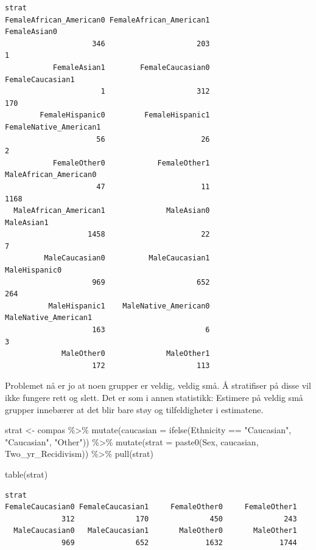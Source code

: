 \documentclass[
  letterpaper,
  DIV=11,
  numbers=noendperiod]{scrreprt}
\newenvironment{Shaded}{\begin{snugshade}}{\end{snugshade}}
\newcommand{\AttributeTok}[1]{\textcolor[rgb]{0.40,0.45,0.13}{#1}}
\newcommand{\FunctionTok}[1]{\textcolor[rgb]{0.28,0.35,0.67}{#1}}
\newcommand{\NormalTok}[1]{\textcolor[rgb]{0.00,0.23,0.31}{#1}}
\newcommand{\OtherTok}[1]{\textcolor[rgb]{0.00,0.23,0.31}{#1}}
\newcommand{\SpecialCharTok}[1]{\textcolor[rgb]{0.37,0.37,0.37}{#1}}
\newcommand{\StringTok}[1]{\textcolor[rgb]{0.13,0.47,0.30}{#1}}
\begin{document}
\begin{verbatim}
strat
FemaleAfrican_American0 FemaleAfrican_American1            FemaleAsian0 
                    346                     203                       1 
           FemaleAsian1        FemaleCaucasian0        FemaleCaucasian1 
                      1                     312                     170 
        FemaleHispanic0         FemaleHispanic1  FemaleNative_American1 
                     56                      26                       2 
           FemaleOther0            FemaleOther1   MaleAfrican_American0 
                     47                      11                    1168 
  MaleAfrican_American1              MaleAsian0              MaleAsian1 
                   1458                      22                       7 
         MaleCaucasian0          MaleCaucasian1           MaleHispanic0 
                    969                     652                     264 
          MaleHispanic1    MaleNative_American0    MaleNative_American1 
                    163                       6                       3 
             MaleOther0              MaleOther1 
                    172                     113 
\end{verbatim}

Problemet nå er jo at noen grupper er veldig, veldig små. Å stratifiser
på disse vil ikke fungere rett og slett. Det er som i annen statistikk:
Estimere på veldig små grupper innebærer at det blir bare støy og
tilfeldigheter i estimatene.

\begin{Shaded}
\begin{Highlighting}[]
\NormalTok{strat }\OtherTok{\textless{}{-}}\NormalTok{ compas }\SpecialCharTok{\%\textgreater{}\%} 
  \FunctionTok{mutate}\NormalTok{(}\AttributeTok{caucasian =} \FunctionTok{ifelse}\NormalTok{(Ethnicity }\SpecialCharTok{==} \StringTok{"Caucasian"}\NormalTok{, }\StringTok{"Caucasian"}\NormalTok{, }\StringTok{"Other"}\NormalTok{)) }\SpecialCharTok{\%\textgreater{}\%} 
  \FunctionTok{mutate}\NormalTok{(}\AttributeTok{strat =} \FunctionTok{paste0}\NormalTok{(Sex, caucasian, Two\_yr\_Recidivism)) }\SpecialCharTok{\%\textgreater{}\%} 
  \FunctionTok{pull}\NormalTok{(strat)}

\FunctionTok{table}\NormalTok{(strat)}
\end{Highlighting}
\end{Shaded}

\begin{verbatim}
strat
FemaleCaucasian0 FemaleCaucasian1     FemaleOther0     FemaleOther1 
             312              170              450              243 
  MaleCaucasian0   MaleCaucasian1       MaleOther0       MaleOther1 
             969              652             1632             1744 
\end{verbatim}
\end{document}
